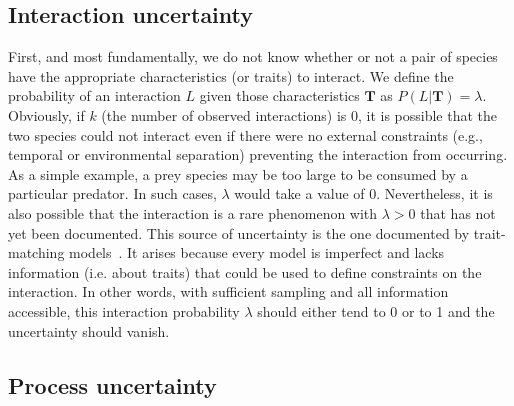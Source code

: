 \documentclass[12pt]{article}
\begin{document}
    \subsection*{Interaction uncertainty} 

    First, and most fundamentally, we do not know whether or not a pair of species have the appropriate characteristics (or traits) to interact. We define the probability of an interaction $L$ given those characteristics $\mathbf{T}$ as $P(L | \mathbf{T})=\lambda$. Obviously, if $k$ (the number of observed interactions) is 0, it is possible that the two species could not interact even if there were no external constraints (e.g., temporal or environmental separation) preventing the interaction from occurring. As a simple example, a prey species may be too large to be consumed by a particular predator. In such cases, $\lambda$ would take a value of 0. 
    Nevertheless, it is also possible that the interaction is a rare phenomenon with $\lambda>0$ that has not yet been documented. This source of uncertainty is the one documented by trait-matching models~\citep{Bartomeus2016}. It arises because every model is imperfect and lacks information (i.e. about traits) that could be used to define constraints on the interaction. In other words, with sufficient sampling and all information accessible, this interaction probability $\lambda$ should either tend to 0 or to 1 and the uncertainty should vanish. 

    \subsection*{Process uncertainty} 
\end{document}
